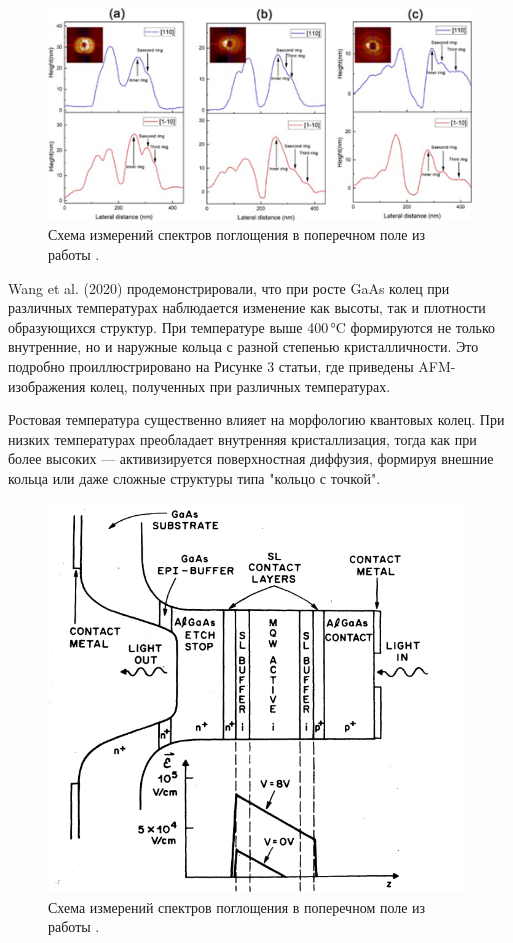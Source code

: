 \documentclass[14pt,oneside]{extarticle}
\begin{document}
\begin{figure}
\begin{center}
        \includegraphics[width=15cm]{images/Wang1-Fingure2.png}
        \caption{\label{fig:Wang1-2}
            Схема измерений спектров поглощения в поперечном поле из работы \cite{Wang1}.}
\end{center}
\end{figure}

Wang et al. (2020) продемонстрировали, что при росте GaAs колец при различных температурах наблюдается изменение как высоты, так и плотности образующихся структур. При температуре выше 400 °C формируются не только внутренние, но и наружные кольца с разной степенью кристалличности. Это подробно проиллюстрировано на Рисунке 3 статьи, где приведены AFM-изображения колец, полученных при различных температурах.

Ростовая температура существенно влияет на морфологию квантовых колец. При низких температурах преобладает внутренняя кристаллизация, тогда как при более высоких — активизируется поверхностная диффузия, формируя внешние кольца или даже сложные структуры типа "кольцо с точкой". 

\begin{figure}
\begin{center}
    \includegraphics[width=11cm]{images/Miller2-Figure2.png}
    \caption{\label{fig:miller2-2}
        Схема измерений спектров поглощения в поперечном поле из работы \cite{miller1}.}
\end{center}
\end{figure}
    
\end{document}
